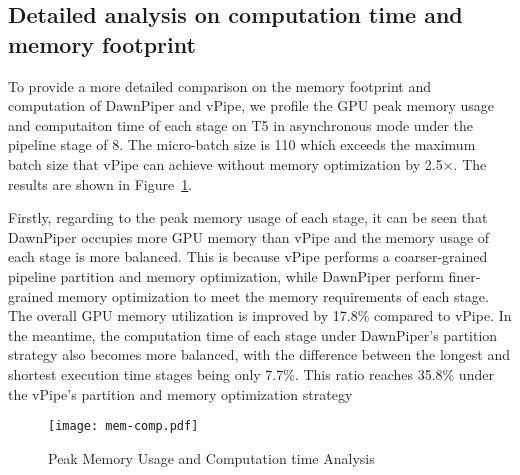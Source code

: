 \subsection{Detailed analysis on computation time and memory footprint}
To provide a more detailed comparison on the memory footprint and computation of DawnPiper and vPipe,
we profile the GPU peak memory usage and computaiton time
of each stage on T5 in asynchronous mode under the pipeline stage of 8.
The micro-batch size is 110 which exceeds the maximum batch size that vPipe
can achieve without memory optimization by 2.5$\times$.
The results are shown in Figure~\ref{fig:mem-comp}. 

Firstly, regarding to the peak memory usage of each stage,
it can be seen that DawnPiper occupies more GPU memory than vPipe
and the memory usage of each stage is more balanced.
This is because vPipe performs a coarser-grained pipeline partition and memory optimization,
while DawnPiper perform finer-grained memory optimization
to meet the memory requirements of each stage.
The overall GPU memory utilization is improved by 17.8\% compared to vPipe. 
In the meantime, the computation time of each stage under
DawnPiper's partition strategy also becomes more balanced,
with the difference between the longest and shortest execution time stages being only 7.7\%.
This ratio reaches 35.8\% under the vPipe's partition and memory optimization strategy

\begin{figure}
  \centering
  \texttt{[image: mem-comp.pdf]}
  \caption{Peak Memory Usage and Computation time Analysis}
  \label{fig:mem-comp}
\end{figure}
